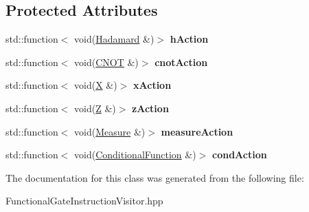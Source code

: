 \subsection*{Protected Attributes}
\begin{DoxyCompactItemize}
\item 
\mbox{\label{a01240_a02f1401c9b0d1da801027f3bc0b5227e}} 
std\+::function$<$ void(\hyperlink{a01308}{Hadamard} \&)$>$ {\bfseries h\+Action}
\item 
\mbox{\label{a01240_a4d6bd8c2fd1af775ed08946942f60a0b}} 
std\+::function$<$ void(\hyperlink{a01300}{C\+N\+OT} \&)$>$ {\bfseries cnot\+Action}
\item 
\mbox{\label{a01240_a9e0295434a2224b776609b057147a9af}} 
std\+::function$<$ void(\hyperlink{a01320}{X} \&)$>$ {\bfseries x\+Action}
\item 
\mbox{\label{a01240_ae197f358e3d0777feb3656455e2ee672}} 
std\+::function$<$ void(\hyperlink{a01324}{Z} \&)$>$ {\bfseries z\+Action}
\item 
\mbox{\label{a01240_a239748abedd67c7b30cad12e545d1926}} 
std\+::function$<$ void(\hyperlink{a01312}{Measure} \&)$>$ {\bfseries measure\+Action}
\item 
\mbox{\label{a01240_a5c0595a70b1f7ae50f3e29a985e249e9}} 
std\+::function$<$ void(\hyperlink{a01304}{Conditional\+Function} \&)$>$ {\bfseries cond\+Action}
\end{DoxyCompactItemize}


The documentation for this class was generated from the following file\+:\begin{DoxyCompactItemize}
\item 
Functional\+Gate\+Instruction\+Visitor.\+hpp\end{DoxyCompactItemize}
